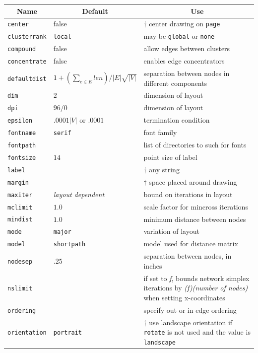 \begin{table}[htbp]\footnotesize
\centering
\begin{tabular}[t]{|l|l|p{2.5in}|} \hline
\multicolumn{1}{|c|}{Name} & \multicolumn{1}{c|}{Default} & \multicolumn{1}{c|}{Use} \\ \hline
{\tt center} & false & $\dagger$ center drawing on {\tt page} \\ 
{\tt clusterrank} & {\tt local} & may be {\tt global} or {\tt none} \\
{\tt compound} & false & allow edges between clusters \\
{\tt concentrate} & false & enables edge concentrators  \\
{\tt defaultdist} & $1+(\sum_{e \in E} len)/|E|\sqrt{|V|}$  & separation between nodes in different components \\
{\tt dim} & $2$ & dimension of layout  \\
{\tt dpi} & $96/0$ & dimension of layout  \\
{\tt epsilon} & $.0001 |V|$ or $.0001$ & termination condition  \\
{\tt fontname} & {\tt serif} & font family \\
{\tt fontpath} &  & list of directories to such for fonts \\
{\tt fontsize} & $14$ & point size of label \\
{\tt label} & & $\dagger$ any string \\
{\tt margin} & & $\dagger$ space placed around drawing \\
{\tt maxiter} & {\em layout dependent} & bound on iterations in layout \\
{\tt mclimit} & $1.0$ & scale factor for mincross iterations \\
{\tt mindist} & $1.0$ & minimum distance between nodes \\
{\tt mode} & {\tt major} & variation of layout \\
{\tt model} & {\tt shortpath} & model used for distance matrix \\
{\tt nodesep} & $.25$ & separation between nodes, in inches \\
{\tt nslimit} & & if set to {\it f}, bounds network simplex iterations by {\it (f)(number of nodes)} when setting x-coordinates \\
{\tt ordering} &  & specify out or in edge ordering \\
{\tt orientation} & {\tt portrait} & $\dagger$ use landscape orientation if {\tt rotate} is not used and the value is {\tt landscape} \\

\end{tabular}
\end{table}

